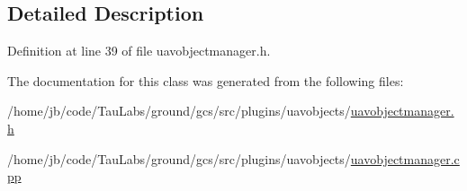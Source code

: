 \subsection{\-Detailed \-Description}


\-Definition at line 39 of file uavobjectmanager.\-h.



\-The documentation for this class was generated from the following files\-:\begin{DoxyCompactItemize}
\item 
/home/jb/code/\-Tau\-Labs/ground/gcs/src/plugins/uavobjects/\hyperlink{uavobjectmanager_8h}{uavobjectmanager.\-h}\item 
/home/jb/code/\-Tau\-Labs/ground/gcs/src/plugins/uavobjects/\hyperlink{uavobjectmanager_8cpp}{uavobjectmanager.\-cpp}\end{DoxyCompactItemize}
